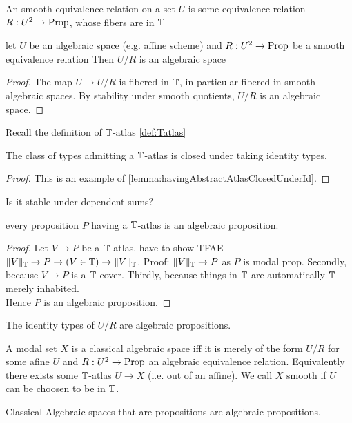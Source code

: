 \documentclass{article}
\begin{document}
\begin{definition}
	An smooth equivalence relation on a set $U$ is some equivalence relation $R : U^2 \to \operatorname{Prop}$, whose fibers are in $\mathbb{T}$
\end{definition}
\begin{lemma}
	let $U$ be an algebraic space (e.g. affine scheme) and $R : U^2 \to \operatorname{Prop}$ be a smooth equivalence relation %
	Then $U / R$ is an algebraic space
\end{lemma}
\begin{proof}
	The map $U \to U / R$ is fibered in $\mathbb{T}$, in particular fibered in smooth algebraic spaces.%
	By stability under smooth quotients, $U / R$ is an algebraic space.
\end{proof}
Recall the definition of $\mathbb{T}$-atlas \ref{def:Tatlas}
\begin{lemma}{\label{lemma:havingAtlasClosedUnderId}}
		The class of types admitting a $\mathbb{T}$-atlas is closed under taking identity types. 
\end{lemma}
\begin{proof}
This is an example of \ref{lemma:havingAbstractAtlasClosedUnderId}.
\end{proof}
\begin{question}
	Is it stable under dependent sums?
\end{question}

\begin{prop}
	every proposition $P$ having a $\mathbb{T}$-atlas is an algebraic proposition.

\end{prop}
\begin{proof}
	Let $V \to P$ be a $\mathbb{T}$-atlas.
	have to show TFAE $\|V\|_{\mathbb{T}} \to P \to (V \in \mathbb{T}) \to \|V\|_{\mathbb{T}}$. 
	Proof: $\|V\|_{\mathbb{T}} \to P$ as $P$ is modal prop. Secondly, because $V \to P$ is a $\mathbb{T}$-cover. Thirdly, because things in $\mathbb{T}$ are automatically $\mathbb{T}$-merely inhabited. \\
	Hence $P$ is an algebraic proposition.	
\end{proof}
\begin{corollary}
	The identity types of $U / R$ are algebraic propositions. %
\end{corollary}
\begin{definition}
	A modal set $X$ is a classical algebraic space iff it is merely of the form $U / R$ for some afine $U$ and  $R : U^2 \to \operatorname{Prop}$ an algebraic equivalence relation. Equivalently there exists some $\mathbb{T}$-atlas $U \to X$ (i.e. out of an affine). We call $X$ smooth if $U$ can be choosen to be in $\mathbb{T}$.
\end{definition}
\begin{corollary}
	Classical Algebraic spaces that are propositions are algebraic propositions.
\end{corollary}
\end{document}
